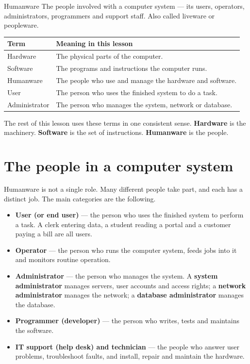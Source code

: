 \begin{definitionbox}{Humanware}
The people involved with a computer system --- its users, operators,
administrators, programmers and support staff. Also called liveware or
peopleware.
\end{definitionbox}

\begin{center}
\begin{tabular}{p{}p{}}
\toprule
\textbf{Term} & \textbf{Meaning in this lesson} \\
\midrule
Hardware & The physical parts of the computer. \\
Software & The programs and instructions the computer runs. \\
Humanware & The people who use and manage the hardware and software. \\
User & The person who uses the finished system to do a task. \\
Administrator & The person who manages the system, network or database. \\
\bottomrule
\end{tabular}
\end{center}

The rest of this lesson uses these terms in one consistent sense.
\textbf{Hardware} is the machinery. \textbf{Software} is the set of
instructions. \textbf{Humanware} is the people.

\section{The people in a computer system}
Humanware is not a single role. Many different people take part, and each has
a distinct job. The main categories are the following.

\begin{itemize}
  \item \textbf{User (or end user)} --- the person who uses the finished
    system to perform a task. A clerk entering data, a student reading a
    portal and a customer paying a bill are all users.
  \item \textbf{Operator} --- the person who runs the computer system, feeds
    jobs into it and monitors routine operation.
  \item \textbf{Administrator} --- the person who manages the system. A
    \textbf{system administrator} manages servers, user accounts and access
    rights; a \textbf{network administrator} manages the network; a
    \textbf{database administrator} manages the database.
  \item \textbf{Programmer (developer)} --- the person who writes, tests and
    maintains the software.
  \item \textbf{IT support (help desk) and technician} --- the people who
    answer user problems, troubleshoot faults, and install, repair and
    maintain the hardware.
\end{itemize}

